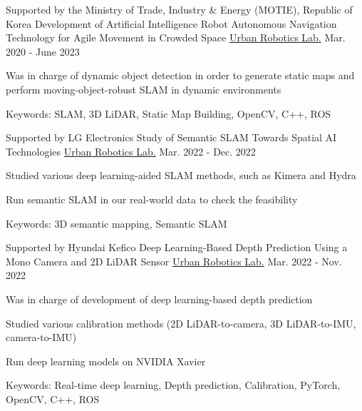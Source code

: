 

\newcommand{\urban}{\href{https://urobot.kaist.ac.kr/}{Urban Robotics Lab.}}
\begin{cventries}

  \cventry
    {Supported by the Ministry of Trade, Industry \& Energy (MOTIE), Republic of Korea} %
    {Development of Artificial Intelligence Robot Autonomous Navigation Technology for Agile Movement in Crowded Space} %
    {\urban} %
    {Mar. 2020 - June 2023} %
    {
      \begin{cvitems} %
        \item Was in charge of dynamic object detection in order to generate static maps and perform moving-object-robust SLAM in dynamic environments
        \item Keywords: SLAM, 3D LiDAR, Static Map Building, OpenCV, C++, ROS
      \end{cvitems}
    }

  \cventry
    {Supported by LG Electronics} %
    {Study of Semantic SLAM Towards Spatial AI Technologies} %
    {\urban} %
    {Mar. 2022 - Dec. 2022} %
    {
      \begin{cvitems} %
        \item Studied various deep learning-aided SLAM methods, such as Kimera and Hydra
        \item Run semantic SLAM in our real-world data to check the feasibility
        \item Keywords: 3D semantic mapping, Semantic SLAM
      \end{cvitems}
    }

  \cventry
    {Supported by Hyundai Kefico} %
    {Deep Learning-Based Depth Prediction Using a Mono Camera and 2D LiDAR Sensor} %
    {\urban} %
    {Mar. 2022 - Nov. 2022} %
    {
      \begin{cvitems} %
        \item Was in charge of development of deep learning-based depth prediction
        \item Studied various calibration methods (2D LiDAR-to-camera, 3D LiDAR-to-IMU, camera-to-IMU)
        \item Run deep learning models on NVIDIA Xavier
        \item Keywords: Real-time deep learning, Depth prediction, Calibration, PyTorch, OpenCV, C++, ROS
      \end{cvitems}
    }


\end{cventries}
